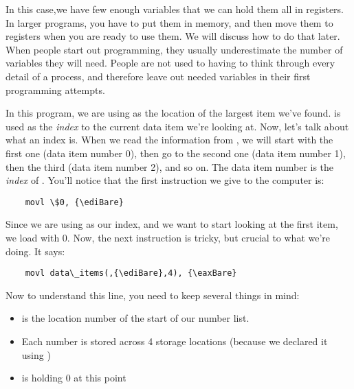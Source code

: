 In this case,we have few enough variables that we can hold them all in 
registers.  In larger programs, you have to put them in memory, and then move
them to registers when you are ready to use them.  We will discuss how 
to do that later.  When people start out programming, they usually 
underestimate the number of variables they will need.  People are not used 
to having to think through every detail of a process, and therefore leave out
needed variables in their first programming attempts.

In this program, we are using {\ebxReg} as the location 
of the largest item we've found.  {\ediReg} is used as the 
\emph{index} to the current data item we're looking at.  
Now, let's talk about what an index is.  When we read the information 
from ,
we will start with the first one (data item number 0), then go to the second
one (data item number 1), then the third (data item number 2), and so on.  
The data item number is the \emph{index} of 
.  You'll notice that the first instruction
we give to the computer is:

\begin{simpletyping}
\begin{lstlisting}
	movl \$0, {\ediBare}
\end{lstlisting}
\end{simpletyping}

Since we are using \icode{{\ediBare}} as our index, and we want to start
looking at the first item, we load \icode{{\ediBare}} with 0.  Now,
the next instruction is tricky, but crucial to what we're doing.  It says:

\begin{simpletyping}
\begin{lstlisting}
	movl data\_items(,{\ediBare},4), {\eaxBare}
\end{lstlisting}
\end{simpletyping}


Now to understand this line, you need to keep several things in mind:

\begin{itemize}\item {} is the location number of the start of our number list. 
\item Each number is stored across 4 storage locations (because we declared it using ) 
\item \icode{{\ediBare}} is holding 0 at this point 
\end{itemize}

